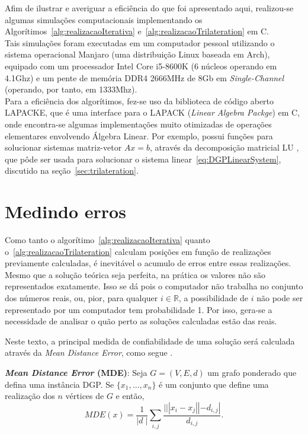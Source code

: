\documentclass[a4paper,12pt]{report}
\begin{document}
	Afim de ilustrar e averiguar a eficiência do que foi apresentado aqui, realizou-se algumas simulações computacionais implementando os Algorítimos~\ref{alg:realizacaoIterativa} e~\ref{alg:realizacaoTrilateration} em C. 
	\\
	
	Tais simulações foram executadas em um computador pessoal utilizando o sistema operacional Manjaro (uma distribuição Linux baseada em Arch), equipado com um processador Intel Core i5-8600K (6 núcleos operando em 4.1Ghz) e um pente de memória DDR4 2666MHz de 8Gb em \textit{Single-Channel} (operando, por tanto, em 1333Mhz).	
	\\
	
	Para a eficiência dos algorítimos, fez-se uso da biblioteca de código aberto LAPACKE, que é uma interface para o LAPACK (\textit{Linear Algebra Packge}) em C, onde encontra-se algumas implementações muito otimizadas de operações elementares envolvendo Álgebra Linear. Por exemplo, possui funções para solucionar sistemas matriz-vetor $Ax = b$, através da decomposição matricial LU \cite{AlgebraLinearElon}, que pôde ser usada para solucionar o sistema linear~\ref{eq:DGPLinearSystem}, discutido na seção~\ref{sec:trilateration}.
	
	\section{Medindo erros}%
	
	Como tanto o algorítimo~\ref{alg:realizacaoIterativa} quanto o~\ref{alg:realizacaoTrilateration} calculam posições em função de realizações previamente calculadas, é inevitável o acumulo de erros entre essas realizações. Mesmo que a solução teórica seja perfeita, na prática os valores não são representados exatamente. Isso se dá pois o computador não trabalha no conjunto dos números reais, ou, pior, para qualquer $i \in\mathbb{R}$, a possibilidade de $i$ não pode ser representado por um computador tem probabilidade 1. Por isso, gera-se a necessidade de analisar o quão perto as soluções calculadas estão das reais.
	
	Neste texto, a principal medida de confiabilidade de uma solução será calculada através da \textit{Mean Distance Error}, como segue \cite{mucherino:BP}.
	
	\begin{center}
		\begin{minipage}{0.9 \linewidth}
			\textbf{\textit{Mean Distance Error} (MDE)}: Seja $G= (V,E,d)$ um grafo ponderado que defina uma instância DGP. Se $\{x_1, \dots, x_n\}$ é um conjunto que define uma realização dos $n$ vértices de $G$ e então,
			$$MDE(x) = \frac{1}{|d\;|} \sum_{i,j}^{}\frac{|||x_i - x_j|| - d_{i,j}|}{d_{i,j}} .$$
		\end{minipage}
	\end{center}
	
\end{document}

